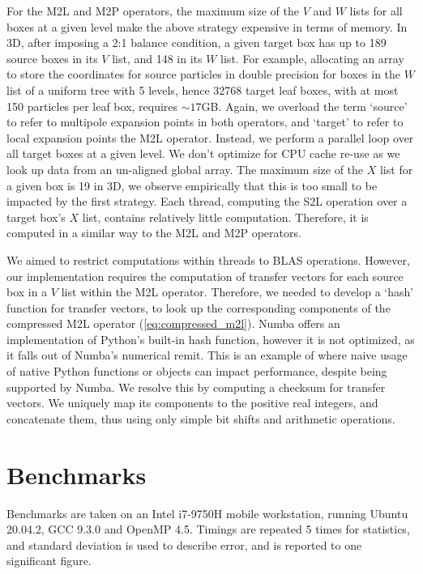 \documentclass{IEEEcsmag}
\begin{document}
For the M2L and M2P operators, the maximum size of the $V$ and $W$ lists for all boxes at a given level make the above strategy expensive in terms of memory. In 3D, after imposing a 2:1 balance condition, a given target box has up to 189 source boxes in its $V$ list, and 148 in its $W$ list. For example, allocating an array to store the coordinates for source particles in double precision for boxes in the $W$ list of a uniform tree with 5 levels, hence 32768 target leaf boxes, with at most 150 particles per leaf box, requires $\sim 17$GB. Again, we overload the term `source' to refer to multipole expansion points in both operators, and `target' to refer to local expansion points the M2L operator. Instead, we perform a parallel loop over all target boxes at a given level. We don't optimize for CPU cache re-use as we look up data from an un-aligned global array. The maximum size of the $X$ list for a given box is 19 in 3D, we observe empirically that this is too small to be impacted by the first strategy. Each thread, computing the S2L operation over a target box's $X$ list, contains relatively little computation. Therefore, it is computed in a similar way to the M2L and M2P operators.

We aimed to restrict computations within threads to BLAS operations. However, our implementation requires the computation of transfer vectors for each source box in a $V$ list within the M2L operator. Therefore, we needed to develop a `hash' function for transfer vectors, to look up the corresponding components of the compressed M2L operator (\ref{eq:compressed_m2l}). Numba offers an implementation of Python's built-in hash function, however it is not optimized, as it falls out of Numba's numerical remit. This is an example of where naive usage of native Python functions or objects can impact performance, despite being supported by Numba. We resolve this by computing a checksum for transfer vectors. We uniquely map its components to the positive real integers, and concatenate them, thus using only simple bit shifts and arithmetic operations.

\section{Benchmarks}

Benchmarks are taken on an Intel i7-9750H mobile workstation, running Ubuntu 20.04.2, GCC 9.3.0 and OpenMP 4.5. Timings are repeated 5 times for statistics, and standard deviation is used to describe error, and is reported to one significant figure.
\end{document}
